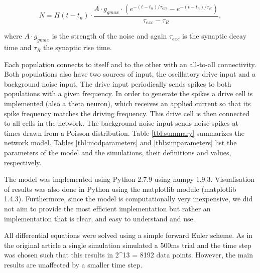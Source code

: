 \documentclass[10pt,a4paper,onecolumn]{article}
\begin{document}
\[N=H(t-t_n) \cdot \frac{A \cdot g _{gmax} \cdot (e^{-(t-t _n)/ \tau _{exc}} - e^{-(t-t _n)/ \tau _R} )}{\tau _{exc} - \tau _R},\]

where \(A \cdot g_{gmax}\) is the strength of the noise and again
\(\tau _{exc}\) is the synaptic decay time and \(\tau_R\) the synaptic
rise time.

Each population connects to itself and to the other with an all-to-all
connectivity. Both populations also have two sources of input, the
oscillatory drive input and a background noise input. The drive input
periodically sends spikes to both populations with a given frequency. In order to generate the spikes
a drive cell is implemented (also a theta neuron), which receives an applied current so that its spike frequency
matches the driving frequency. This drive cell is then connected to all cells in the network.
The background noise input sends noise spikes at times drawn
from a Poisson distribution. Table \ref{tbl:summary} summarizes the
network model. Tables \ref{tbl:modparameters} and
\ref{tbl:simparameters} list the parameters of the model and the
simulations, their definitions and values, respectively.

The model was implemented using Python 2.7.9 using numpy 1.9.3.
Visualisation of results was also done in Python using the matplotlib
module (matplotlib 1.4.3). Furthermore, since the model is
computationally very inexpensive, we did not aim to provide the most
efficient implementation but rather an implementation that is clear, and
easy to understand and use.

All differential equations were solved using a simple forward Euler
scheme. As in the original article a single simulation simulated a 500ms
trial and the time step was chosen such that this results in 2\^{}13 =
8192 data points. However, the main results are unaffected by a smaller
time step.
\end{document}
